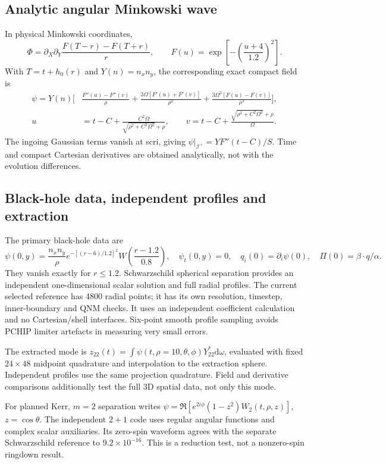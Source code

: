\documentclass[11pt,letterpaper]{article}
\newcommand{\scri}{\mathscr{I}^{+}}
\newcommand{\dd}{\mathrm{d}}
\begin{document}
\subsection{Analytic angular Minkowski wave}
In physical Minkowski coordinates,
\begin{equation}
 \Phi=\partial_X\partial_Y\frac{F(T-r)-F(T+r)}r,\qquad
 F(u)=\exp\left[-\left(\frac{u+4}{1.2}\right)^2\right].
\end{equation}
With $T=t+h_0(r)$ and $Y(n)=n_xn_y$, the corresponding exact compact field is
\begin{align}
 \psi=Y(n)\bigg[&\frac{F''(u)-F''(v)}\rho
 +\frac{3\Omega[F'(u)+F'(v)]}{\rho^2}
 +\frac{3\Omega^2[F(u)-F(v)]}{\rho^3}\bigg],\\
 u&=t-C+\frac{C^2\Omega}{\sqrt{\rho^2+C^2\Omega^2}+\rho},\qquad
 v=t-C+\frac{\sqrt{\rho^2+C^2\Omega^2}+\rho}{\Omega}.
\end{align}
The ingoing Gaussian terms vanish at scri, giving $\psi|_{\scri}=YF''(t-C)/S$. Time and compact Cartesian derivatives are obtained analytically, not with the evolution differences.

\subsection{Black-hole data, independent profiles and extraction}
The primary black-hole data are
\begin{equation}
 \psi(0,y)=\frac{n_xn_y}{\rho}e^{-[(r-6)/1.2]^2}W\!\left(\frac{r-1.2}{0.8}\right),\quad
 \psi_t(0,y)=0,\quad q_i(0)=\partial_i\psi(0),\quad \Pi(0)=\beta\cdot q/\alpha.
\end{equation}
They vanish exactly for $r\leq1.2$. Schwarzschild spherical separation provides an independent one-dimensional scalar solution and full radial profiles. The current selected reference has 4800 radial points; it has its own resolution, timestep, inner-boundary and QNM checks. It uses an independent coefficient calculation and no Cartesian/shell interfaces. Six-point smooth profile sampling avoids PCHIP limiter artefacts in measuring very small errors.

The extracted mode is $z_{22}(t)=\int\psi(t,\rho=10,\theta,\phi)Y_{22}^*\dd\omega$, evaluated with fixed $24\times48$ midpoint quadrature and interpolation to the extraction sphere. Independent profiles use the same projection quadrature. Field and derivative comparisons additionally test the full 3D spatial data, not only this mode.

For planned Kerr, $m=2$ separation writes $\psi=\Re[e^{2i\phi}(1-z^2)W_2(t,\rho,z)]$, $z=\cos\theta$. The independent $2+1$ code uses regular angular functions and complex scalar auxiliaries. Its zero-spin waveform agrees with the separate Schwarzschild reference to $9.2\times10^{-16}$. This is a reduction test, not a nonzero-spin ringdown result.
\end{document}
